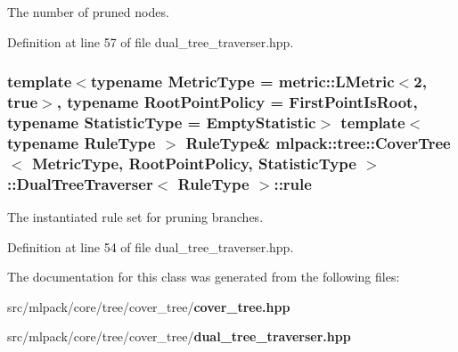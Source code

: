 The number of pruned nodes. 



Definition at line 57 of file dual\-\_\-tree\-\_\-traverser.\-hpp.

\subsubsection[{rule}]{\setlength{\rightskip}{0pt plus 5cm}template$<$typename Metric\-Type  = metric\-::\-L\-Metric$<$2, true$>$, typename Root\-Point\-Policy  = First\-Point\-Is\-Root, typename Statistic\-Type  = Empty\-Statistic$>$ template$<$typename Rule\-Type $>$ Rule\-Type\& {\bf mlpack\-::tree\-::\-Cover\-Tree}$<$ Metric\-Type, Root\-Point\-Policy, Statistic\-Type $>$\-::{\bf Dual\-Tree\-Traverser}$<$ Rule\-Type $>$\-::rule\hspace{0.3cm}{\ttfamily [private]}}\label{classmlpack_1_1tree_1_1CoverTree_1_1DualTreeTraverser_ae8e9a89f3d4aa6eecb9dba27607d30c1}


The instantiated rule set for pruning branches. 



Definition at line 54 of file dual\-\_\-tree\-\_\-traverser.\-hpp.



The documentation for this class was generated from the following files\-:\begin{DoxyCompactItemize}
\item 
src/mlpack/core/tree/cover\-\_\-tree/{\bf cover\-\_\-tree.\-hpp}\item 
src/mlpack/core/tree/cover\-\_\-tree/{\bf dual\-\_\-tree\-\_\-traverser.\-hpp}\end{DoxyCompactItemize}
